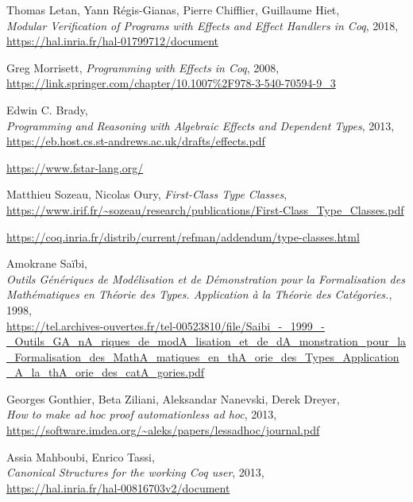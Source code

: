 \documentclass[declaration,inz,english,shortabstract]{iithesis}
\begin{document}
\begin{thebibliography}{1}
        Thomas Letan, Yann Régis-Gianas, Pierre Chifflier, Guillaume Hiet, \\
        \textit{Modular Verification of Programs with Effects and Effect Handlers in Coq}, 2018, \\
        \url{https://hal.inria.fr/hal-01799712/document}

        Greg Morrisett,
        \textit{Programming with Effects in Coq}, 2008, \\
        \url{https://link.springer.com/chapter/10.1007%2F978-3-540-70594-9_3}

        Edwin C. Brady, \\
        \textit{Programming and Reasoning with Algebraic Effects and Dependent Types}, 2013, \\
        \url{https://eb.host.cs.st-andrews.ac.uk/drafts/effects.pdf}

        \url{https://www.fstar-lang.org/}
    
        Matthieu Sozeau, Nicolas Oury,
        \textit{First-Class Type Classes}, \\
        \url{https://www.irif.fr/~sozeau/research/publications/First-Class_Type_Classes.pdf}

        \url{https://coq.inria.fr/distrib/current/refman/addendum/type-classes.html}

        Amokrane Saïbi, \\
        \textit{Outils Génériques de Modélisation et de Démonstration pour la Formalisation des Mathématiques en Théorie des Types. Application à la Théorie des Catégories.}, 1998, \\
        \url{https://tel.archives-ouvertes.fr/tel-00523810/file/Saibi_-_1999_-_Outils_GA_nA_riques_de_modA_lisation_et_de_dA_monstration_pour_la_Formalisation_des_MathA_matiques_en_thA_orie_des_Types_Application_A_la_thA_orie_des_catA_gories.pdf}

        Georges Gonthier, Beta Ziliani, Aleksandar Nanevski, Derek Dreyer, \\
        \textit{How to make ad hoc proof automationless ad hoc}, 2013, \\
        \url{https://software.imdea.org/~aleks/papers/lessadhoc/journal.pdf}

        Assia Mahboubi, Enrico Tassi, \\
        \textit{Canonical Structures for the working Coq user}, 2013, \\
        \url{https://hal.inria.fr/hal-00816703v2/document}


\end{thebibliography}
\end{document}
